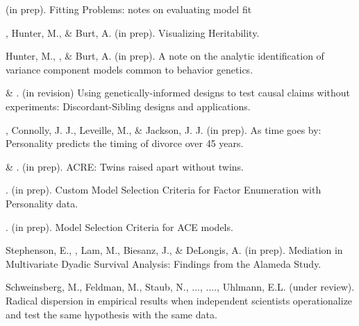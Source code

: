 \item \meb (in prep). Fitting Problems: notes on evaluating model fit

\item \meb, Hunter, M., \& Burt, A. (in prep). Visualizing Heritability.

\item Hunter, M., \meb, \& Burt, A. (in prep). A note on the analytic identification of variance component models common to behavior genetics.

\item \meb \& \joe. (in revision) Using genetically-informed designs to test causal claims without experiments: Discordant-Sibling designs and applications. \href{https://osf.io/zpdwt/}{\small\color{blue}{osf.io/zpdwt/}}%

\item\meb, Connolly, J. J., Leveille, M., \& Jackson, J. J. (in prep). As time goes by: Personality predicts the timing of divorce over 45 years.%
\item \meb \& \joe.  (in prep). ACRE: Twins raised apart without twins.
\item \meb. (in prep). Custom Model Selection Criteria for Factor Enumeration with Personality data.
\item \meb. (in prep). Model Selection Criteria for ACE models.
\item Stephenson, E., \meb, Lam, M., Biesanz, J., \& DeLongis, A. (in prep). Mediation in Multivariate Dyadic Survival Analysis: Findings from the Alameda Study. %
\item Schweinsberg, M., Feldman, M., Staub, N., ..., \meb ...., Uhlmann, E.L. (under review). Radical dispersion in empirical results when independent scientists operationalize and test the same hypothesis with the same data. %
\vspace{-2mm}\begin{center}\end{center} \vspace{-4mm}
